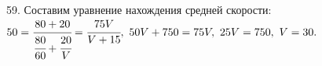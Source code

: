 59. Составим уравнение нахождения средней скорости: $50=\cfrac{80+20}{\cfrac{80}{60}+\cfrac{20}{V}}=\cfrac{75V}{V+15},\ 50V+750=75V,\ 25V=750,\ V=30.$\\
